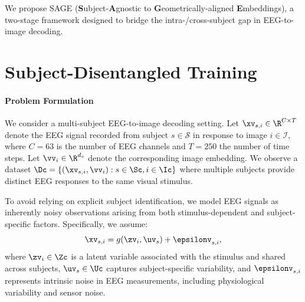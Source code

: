

We propose SAGE (\textbf{S}ubject-\textbf{A}gnostic to \textbf{G}eometrically-aligned \textbf{E}mbeddings), a two-stage framework designed to bridge the intra-/cross-subject gap in EEG-to-image decoding.  

\section{Subject-Disentangled Training}
\label{sec:training}
\paragraph{Problem Formulation}
We consider a multi-subject EEG-to-image decoding setting. Let $\xv_{s,i} \in \R^{C\times T}$   denote the EEG signal recorded from subject $s \in \mathcal{S}$ in response to image $i \in \mathcal{I}$,  where $C=63$ is the number of EEG channels and $T=250$ the number of time steps.  
Let $\vv_i \in \R^{d_v}$ denote the corresponding image embedding.   
We observe a dataset $\Dc = \{(\xv_{s,i}, \vv_i): s\in \Sc, i \in \Ic\}$ where multiple subjects provide distinct EEG responses to the same visual stimulus.

To avoid relying on explicit subject identification, we model EEG signals as inherently noisy observations arising from both stimulus-dependent and subject-specific factors. Specifically, we assume:
\begin{equation} \label{eq:genmodel}
  \xv_{s,i} = g(\zv_i, \uv_s) + \epsilonv_{s,i}, %
\end{equation}
 where $\zv_i \in \Zc$ is a latent variable associated with the stimulus and shared across subjects, $\uv_s \in \Uc$ captures subject-specific variability, and $\epsilonv_{s,i}$ represents intrinsic noise in EEG measurements, including physiological variability and sensor noise.

